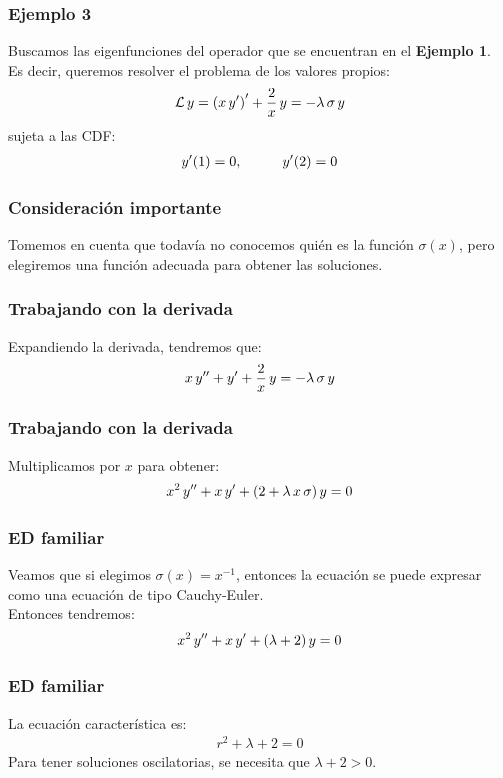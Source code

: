 \documentclass[12pt]{beamer}
\begin{document}
\begin{frame}
\frametitle{Ejemplo 3}
Buscamos las eigenfunciones del operador que se encuentran en el \textbf{Ejemplo 1}. 
\\
\bigskip
\pause
Es decir, queremos resolver el problema de los valores propios:\
\pause
\begin{align}
\mathcal{L} \, y = \left( x \, {y}^{\prime} \right)^{\prime} + \dfrac{2}{x} \, y = - \lambda \, \sigma \, y
\label{eq:ecuacion_04_14}
\end{align}
sujeta a las CDF:
\begin{align*}
{y}^{\prime} (1) = 0, \hspace{1cm} {y}^{\prime}(2) = 0
\end{align*}
\end{frame}
\begin{frame}
\frametitle{Consideración importante}
Tomemos en cuenta que todavía no conocemos quién es la función $\sigma (x)$, pero elegiremos una función adecuada para obtener las soluciones.
\end{frame}
\begin{frame}
\frametitle{Trabajando con la derivada}
Expandiendo la derivada, tendremos que:
\pause
\begin{align*}
x \, {y}^{\prime \prime} + {y}^{\prime} + \dfrac{2}{x} \, y = - \lambda \, \sigma \, y
\end{align*}
\end{frame}
\begin{frame}
\frametitle{Trabajando con la derivada}
Multiplicamos por $x$ para obtener:
\pause
\begin{align*}
x^{2} \, {y}^{\prime \prime} + x \, {y}^{\prime} + (2 + \lambda \, x \,  \sigma) \, y = 0
\end{align*}
\end{frame}
\begin{frame}
\frametitle{ED familiar}
Veamos que si elegimos $\sigma(x) = x^{-1}$, entonces la ecuación se puede expresar como una ecuación de tipo Cauchy-Euler.
\\
\bigskip
\pause
Entonces tendremos:
\pause
\begin{align*}
x^{2} \, {y}^{\prime \prime} + x \, {y}^{\prime} + (\lambda + 2) \, y = 0
\end{align*}
\end{frame}
\begin{frame}
\frametitle{ED familiar}
La ecuación característica es:
\pause
\begin{align*}
r^{2} + \lambda + 2 = 0
\end{align*}
\pause
Para tener soluciones oscilatorias, se necesita que $\lambda + 2 > 0$.
\end{frame}
\end{document}
